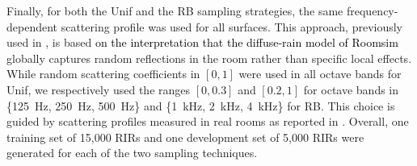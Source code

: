 \documentclass[reprint]{JASA}
\begin{document}
Finally, for both the Unif and the RB sampling strategies, the same frequency-dependent scattering profile was used for all surfaces. This approach, previously used in \cite{gaultier2017vast}, is based \textcolor{black}{on the interpretation that the diffuse-rain model of Roomsim} globally captures random reflections in the room rather than specific local effects. While random scattering coefficients in $[0,1]$ were used in all octave bands for Unif, we respectively used the ranges $[0,0.3]$ and $[0.2,1]$ for octave bands in \{125~Hz, 250~Hz, 500~Hz\} and \{1~kHz, 2~kHz, 4~kHz\} for RB. This choice is guided by scattering profiles measured in real rooms as reported in \cite{vorlander2000definition}.
Overall, one training set of 15,000 RIRs and one development set of 5,000 RIRs were generated for each of the two sampling techniques.

\end{document}
